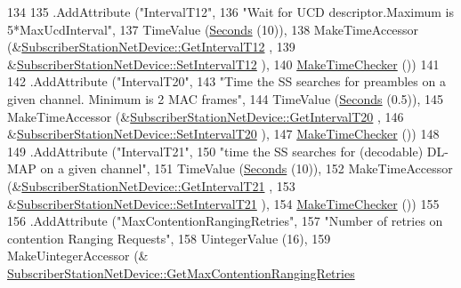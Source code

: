 \begin{DoxyCode}
134 
135     .AddAttribute (\textcolor{stringliteral}{"IntervalT12"},
136                    \textcolor{stringliteral}{"Wait for UCD descriptor.Maximum is 5*MaxUcdInterval"},
137                    TimeValue (\hyperlink{group__timecivil_ga33c34b816f8ff6628e33d5c8e9713b9e}{Seconds} (10)),
138                    MakeTimeAccessor (&\hyperlink{classns3_1_1SubscriberStationNetDevice_a2abfe5609632c7ca5ca9c8e05425983e}{SubscriberStationNetDevice::GetIntervalT12}
      ,
139                                      &\hyperlink{classns3_1_1SubscriberStationNetDevice_aa766c01a50b7dead37cb7e8a8c125866}{SubscriberStationNetDevice::SetIntervalT12}
      ),
140                    \hyperlink{group__time_ga7032965bd4afa578691d88c09e4481c1}{MakeTimeChecker} ())
141 
142     .AddAttribute (\textcolor{stringliteral}{"IntervalT20"},
143                    \textcolor{stringliteral}{"Time the SS searches for preambles on a given channel. Minimum is 2 MAC frames"},
144                    TimeValue (\hyperlink{group__timecivil_ga33c34b816f8ff6628e33d5c8e9713b9e}{Seconds} (0.5)),
145                    MakeTimeAccessor (&\hyperlink{classns3_1_1SubscriberStationNetDevice_a610c71850cdc6979a37516bff65b335b}{SubscriberStationNetDevice::GetIntervalT20}
      ,
146                                      &\hyperlink{classns3_1_1SubscriberStationNetDevice_a3632a6e8747c623d76a42ba04d1e2bff}{SubscriberStationNetDevice::SetIntervalT20}
      ),
147                    \hyperlink{group__time_ga7032965bd4afa578691d88c09e4481c1}{MakeTimeChecker} ())
148 
149     .AddAttribute (\textcolor{stringliteral}{"IntervalT21"},
150                    \textcolor{stringliteral}{"time the SS searches for (decodable) DL-MAP on a given channel"},
151                    TimeValue (\hyperlink{group__timecivil_ga33c34b816f8ff6628e33d5c8e9713b9e}{Seconds} (10)),
152                    MakeTimeAccessor (&\hyperlink{classns3_1_1SubscriberStationNetDevice_a50ca17be4aafba3a5e4fe0b09377f63d}{SubscriberStationNetDevice::GetIntervalT21}
      ,
153                                      &\hyperlink{classns3_1_1SubscriberStationNetDevice_a3515531d206ef5a6f22e280e438ed323}{SubscriberStationNetDevice::SetIntervalT21}
      ),
154                    \hyperlink{group__time_ga7032965bd4afa578691d88c09e4481c1}{MakeTimeChecker} ())
155 
156     .AddAttribute (\textcolor{stringliteral}{"MaxContentionRangingRetries"},
157                    \textcolor{stringliteral}{"Number of retries on contention Ranging Requests"},
158                    UintegerValue (16),
159                    MakeUintegerAccessor (&
      \hyperlink{classns3_1_1SubscriberStationNetDevice_a3aed1d6f40215ad2f993854d456e92a2}{SubscriberStationNetDevice::GetMaxContentionRangingRetries}

\end{DoxyCode}
